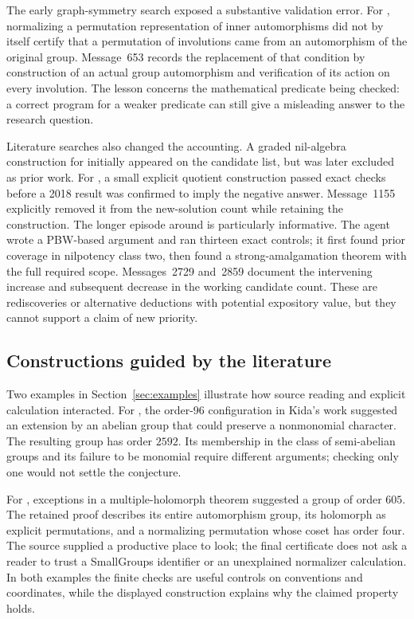 The early graph-symmetry search exposed a substantive validation error.
For , normalizing a permutation representation of inner
automorphisms did not by itself certify that a permutation of involutions
came from an automorphism of the original group. Message~653 records
the replacement of that condition by construction of an actual group
automorphism and verification of its action on every involution.
The lesson concerns the mathematical predicate being checked: a correct
program for a weaker predicate can still give a misleading answer to the
research question.

Literature searches also changed the accounting. A graded nil-algebra
construction for  initially appeared on the candidate list,
but was later excluded as prior work. For , a small explicit
quotient construction passed exact checks before a 2018 result was
confirmed to imply the negative answer. Message~1155 explicitly
removed it from the new-solution count while retaining the construction.
The longer episode around  is particularly informative.
The agent wrote a PBW-based argument and ran thirteen exact controls;
it first found prior coverage in nilpotency class two, then found a
strong-amalgamation theorem with the full required scope. Messages~2729
and~2859 document the intervening increase and subsequent decrease in
the working candidate count. These are rediscoveries or alternative
deductions with potential expository value, but they cannot support a
claim of new priority.

\subsection{Constructions guided by the literature}

Two examples in Section~\ref{sec:examples} illustrate how source reading
and explicit calculation interacted. For , the order-96
configuration in Kida's work suggested an extension by an abelian
group that could preserve a nonmonomial character. The resulting
group has order \(2592\). Its membership in the class of semi-abelian
groups and its failure to be monomial require different arguments;
checking only one would not settle the conjecture.

For , exceptions in a multiple-holomorph theorem suggested
a group of order \(605\). The retained proof describes its entire
automorphism group, its holomorph as explicit permutations, and a
normalizing permutation whose coset has order four. The source supplied
a productive place to look; the final certificate does not ask a reader
to trust a SmallGroups identifier or an unexplained normalizer
calculation. In both examples the finite checks are useful controls on
conventions and coordinates, while the displayed construction explains
why the claimed property holds.

